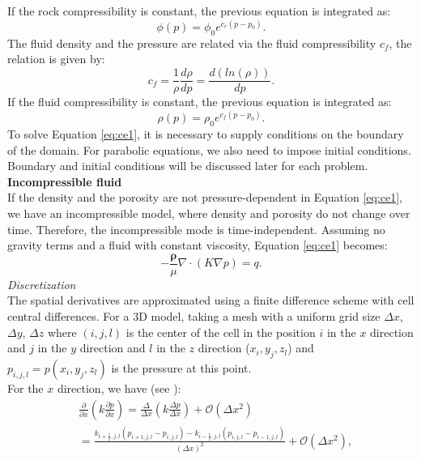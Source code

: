 \documentclass[12pt]{article}
\numberwithin{equation}{section}
\begin{document}
If the rock compressibility is constant, the previous equation is integrated as:
\begin{equation}\label{eq:por}
 \phi(p)=\phi_0 e^{c_r(p-p_0)}.
\end{equation}
The fluid density and the pressure are related via the fluid compressibility $c_f$, the relation is given by:
\begin{equation*}\label{eq:fc}
 c_f=\frac{1}{\rho}\frac{d\rho}{dp}=\frac{d(ln(\rho))}{dp}.
\end{equation*}
If the fluid compressibility is constant, the previous equation is integrated as:
\begin{equation}\label{eq:rhoeq}
 \rho(p)=\rho_0 e^{c_f({p}-{p}_0)}.
\end{equation}
To solve Equation \eqref{eq:ce1}, it is necessary to supply conditions on the boundary of the domain. For parabolic equations, we also need to impose initial conditions. Boundary and initial conditions will be discussed later for each problem.   \\
\textbf{Incompressible fluid}\\
If the density and the porosity are not pressure-dependent in Equation \eqref{eq:ce1}, we have an incompressible model, where density and porosity do not change over time. Therefore, the incompressible mode is time-independent. Assuming no gravity terms and a fluid with constant viscosity, Equation \eqref{eq:ce1} becomes:
\begin{equation}\label{eq:cel}
-\frac{\mathbf{\rho}}{\mu}\nabla \cdot \left({K} \nabla p\right)=q.
\end{equation}
\emph{Discretization}\\
The spatial derivatives are approximated using a finite difference scheme with cell central 
differences. For a 3D model, taking a mesh with a uniform grid size $\Delta x$, $\Delta y$, $\Delta z$ where $(i,j,l)$ is the center 
of the cell
in the position $i$ in the $x$ direction and $j$ in the $y$ direction and $l$ in the $z$ direction
($x_i,y_j,z_l$) and $p_{i,j,l}=p(x_i,y_j,z_l)$ is 
the pressure at this point.
\\ For the $x$ direction, we have (see \cite{Jansen13}):
\begin{align*}
&\frac{\partial}{\partial x}\left(k\frac{\partial p}{\partial x}\right) = 
\frac{\Delta}{\Delta x}\left(k\frac{\Delta p}{\Delta x}\right) +\mathscr{O}(\Delta x^2)\\
&=\frac{ k_{i+\frac{1}{2},j,l}(p_{i+1,j,l}-p_{i,j,l})-k_{i-\frac{1}{2},j,l}(p_{i,j,l}-p_{i-1,j,l})}{\left( \Delta x\right)^2}+\mathscr{O}(\Delta x^2),
\end{align*}
\end{document}
